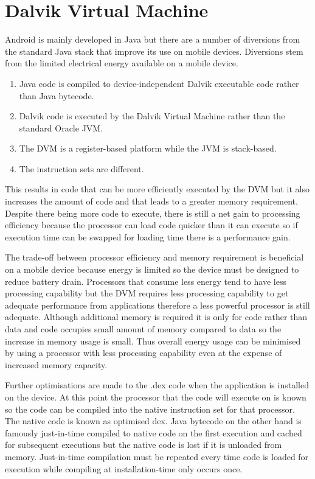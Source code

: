 \section{Dalvik Virtual Machine}
\label{sec:Dalvik Virtual Machine}

Android is mainly developed in Java but there are a number of diversions from the standard Java stack that improve its use on mobile devices.  Diversions stem from the limited electrical energy available on a mobile device.

\begin{enumerate}
\item Java code is compiled to device-independent Dalvik executable code rather than Java bytecode.
\item Dalvik code is executed by the Dalvik Virtual Machine rather than the standard Oracle JVM.
\item The DVM is a register-based platform while the JVM is stack-based.
\item The instruction sets are different.
\end{enumerate}

This results in code that can be more efficiently executed by the DVM but it also increases the amount of code and that leads to a greater memory requirement.  Despite there being more code to execute, there is still a net gain to processing efficiency because the processor can load code quicker than it can execute so if execution time can be swapped for loading time there is a performance gain.

The trade-off between processor efficiency and memory requirement is beneficial on a mobile device because energy is limited so the device must be designed to reduce battery drain.  Processors that consume less energy tend to have less processing capability but the DVM requires less processing capability to get adequate performance from applications therefore a less powerful processor is still adequate.  Although additional memory is required it is only for code rather than data and code occupies small amount of memory compared to data so the increase in memory usage is small.  Thus overall energy usage can be minimised by using a processor with less processing capability even at the expense of increased memory capacity.

Further optimisations are made to the .dex code when the application is installed on the device.  At this point the processor that the code will execute on is known so the code can be compiled into the native instruction set for that processor.  The native code is known as optimised dex.  Java bytecode on the other hand is famously just-in-time compiled to native code on the first execution and cached for subsequent executions but the native code is lost if it is unloaded from memory.  Just-in-time compilation must be repeated every time code is loaded for execution while compiling at installation-time only occurs once.

